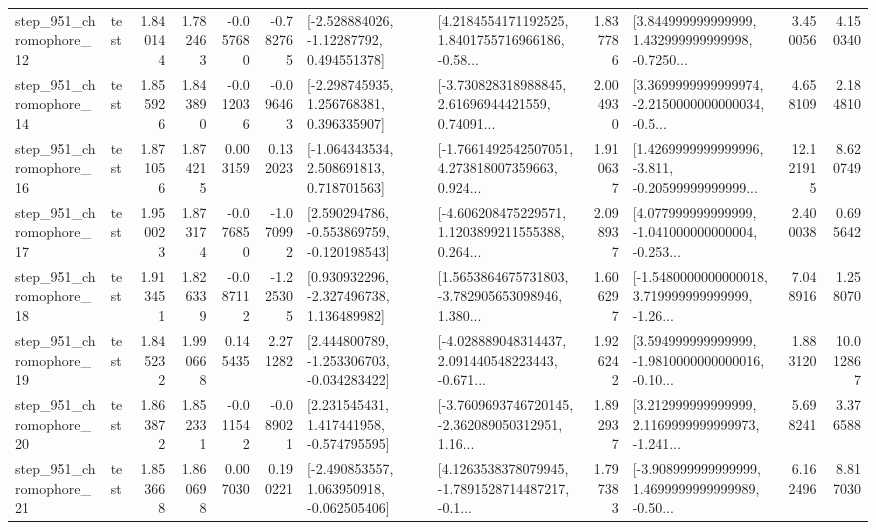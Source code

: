 \begin{tabular}{llrrrrllrlrr}
  step\_951\_chromophore\_12 &      test &      1.840144 &    1.782463 &     -0.057680 & -0.782765 &    [-2.528884026, -1.12287792, 0.494551378] &  [4.2184554171192525, 1.8401755716966186, -0.58... &       1.837786 &  [3.844999999999999, 1.432999999999998, -0.7250... &            3.450056 &          4.150340 \\
  step\_951\_chromophore\_14 &      test &      1.855926 &    1.843890 &     -0.012036 & -0.096463 &    [-2.298745935, 1.256768381, 0.396335907] &  [-3.730828318988845, 2.61696944421559, 0.74091... &       2.004930 &  [3.3699999999999974, -2.2150000000000034, -0.5... &            4.658109 &          2.184810 \\
  step\_951\_chromophore\_16 &      test &      1.871056 &    1.874215 &      0.003159 &  0.132023 &    [-1.064343534, 2.508691813, 0.718701563] &  [-1.7661492542507051, 4.273818007359663, 0.924... &       1.910637 &  [1.4269999999999996, -3.811, -0.20599999999999... &           12.121915 &          8.620749 \\
  step\_951\_chromophore\_17 &      test &      1.950023 &    1.873174 &     -0.076850 & -1.070992 &   [2.590294786, -0.553869759, -0.120198543] &  [-4.606208475229571, 1.1203899211555388, 0.264... &       2.098937 &  [4.077999999999999, -1.041000000000004, -0.253... &            2.400038 &          0.695642 \\
  step\_951\_chromophore\_18 &      test &      1.913451 &    1.826339 &     -0.087112 & -1.225305 &    [0.930932296, -2.327496738, 1.136489982] &  [1.5653864675731803, -3.782905653098946, 1.380... &       1.606297 &  [-1.5480000000000018, 3.719999999999999, -1.26... &            7.048916 &          1.258070 \\
  step\_951\_chromophore\_19 &      test &      1.845232 &    1.990668 &      0.145435 &  2.271282 &   [2.444800789, -1.253306703, -0.034283422] &  [-4.028889048314437, 2.091440548223443, -0.671... &       1.926242 &  [3.594999999999999, -1.9810000000000016, -0.10... &            1.883120 &         10.012867 \\
  step\_951\_chromophore\_20 &      test &      1.863872 &    1.852331 &     -0.011542 & -0.089021 &    [2.231545431, 1.417441958, -0.574795595] &  [-3.7609693746720145, -2.362089050312951, 1.16... &       1.892937 &  [3.212999999999999, 2.1169999999999973, -1.241... &            5.698241 &          3.376588 \\
  step\_951\_chromophore\_21 &      test &      1.853668 &    1.860698 &      0.007030 &  0.190221 &   [-2.490853557, 1.063950918, -0.062505406] &  [4.1263538378079945, -1.7891528714487217, -0.1... &       1.797383 &  [-3.908999999999999, 1.4699999999999989, -0.50... &            6.162496 &          8.817030 \\

\end{tabular}

